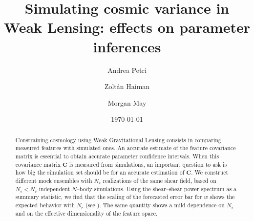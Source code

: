 \documentclass[reprint,aps,prd,superscriptaddress,showkeys,showpacs]{revtex4-1}
\newcommand{\bb}[1]{\mathbf{#1}}
\begin{document}
\title{Simulating cosmic variance in Weak Lensing: effects on parameter inferences}

\author{Andrea Petri}

\author{Zolt\'an Haiman}

\author{Morgan May}

\date{\today}

\label{firstpage}

\begin{abstract}
Constraining cosmology using Weak Gravitational Lensing consists in comparing measured features with simulated ones. An accurate estimate of the feature covariance matrix is essential to obtain accurate parameter confidence intervals. When this covariance matrix $\bb{C}$ is measured from simulations, an important question to ask is how big the simulation set should be for an accurate estimation of $\bb{C}$. We construct different mock ensembles with $N_r$ realizations of the same shear field, based on $N_s<N_r$ independent $N$--body simulations. Using the shear--shear power spectrum as a summary statistic, we find that the scaling of the forecasted error bar for $w$ shows the expected behavior with $N_r$ (see \citep{DodelsonSchneider13}). The same quantity shows a mild dependence on $N_s$ and on the effective dimensionality of the feature space.     
\end{abstract}



\maketitle


\end{document}

